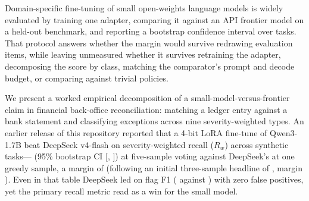 \documentclass[11pt]{article}
\begin{document}
Domain-specific fine-tuning of small open-weights language models is widely evaluated by training one adapter, comparing it against an API frontier model on a held-out benchmark, and reporting a bootstrap confidence interval over tasks. That protocol answers whether the margin would survive redrawing evaluation items, while leaving unmeasured whether it survives retraining the adapter, decomposing the score by class, matching the comparator's prompt and decode budget, or comparing against trivial policies.

We present a worked empirical decomposition of a small-model-versus-frontier claim in financial back-office reconciliation: matching a ledger entry against a bank statement and classifying exceptions across nine severity-weighted types. An earlier release of this repository reported that a 4-bit LoRA fine-tune of Qwen3-1.7B beat DeepSeek v4-flash on severity-weighted recall ($R_w$) across \nBench{} synthetic tasks---\rwChamp{} (95\% bootstrap CI [\rwChampLo{}, \rwChampHi{}]) at five-sample voting against DeepSeek's \rwDS{} at one greedy sample, a margin of \margin{} (following an initial three-sample headline of \rwChampXthree{}, margin \marginXthree{}). Even in that table DeepSeek led on flag F1 (\fOneDS{} against \fOneChamp{}) with zero false positives, yet the primary recall metric read as a win for the small model.
\end{document}
